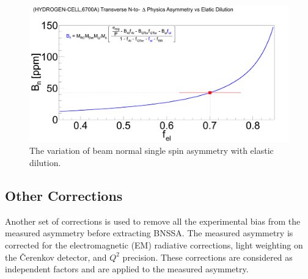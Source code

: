 \begin{figure}[!h]
	\begin{center}
	\includegraphics[width=15.0cm]{figures/asymVsElDilutionLH2}
	\end{center}
	\caption
	{The variation of beam normal single spin asymmetry with elastic dilution.}
	\label{fig:asymVsElDilutionLH2}
\end{figure}


\subsection{Other Corrections}
\label{Other Corrections}
Another set of corrections is used to remove all the experimental bias from the measured asymmetry before extracting BNSSA. The measured asymmetry is corrected for the electromagnetic (EM) radiative corrections, light weighting on the \v{C}erenkov detector, and $Q^{2}$ precision. These corrections are considered as independent factors and are applied to the measured asymmetry.




